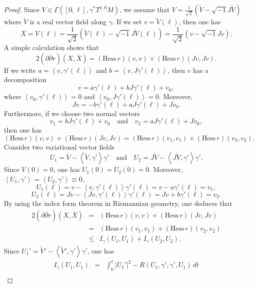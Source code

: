 \documentclass[12pt,reqno]{amsart}
\newcommand\bp{{\bar\partial}}
\theoremstyle{plain}
\theoremstyle{definition}
\newcommand{\sq}{\sqrt{-1}}
\newcommand{\p}{\partial}
\renewcommand{\bar}{\overline}
\newcommand{\beq}{\begin{equation}}
\newcommand{\eeq}{\end{equation}}
\renewcommand{\tilde}{\widetilde}
\newcommand{\qtq}[1]{\quad\mbox{#1}\quad}
\renewcommand{\bp}{\bar{\partial}}
\renewcommand{\>}{\rightarrow}
\newcommand{\LL}{\left\langle}
\newcommand{\RL}{\right\rangle}
\numberwithin{equation}{section} %
\renewcommand{\leq}{\leqslant}
\begin{document}
\begin{proof}
    Since $V\in \Gamma([0,\ell],\gamma^*T^{1,0}M)$, we  assume that $V=\frac{1}{\sqrt{2}}\left(\tilde V-\sq J\tilde V\right)$ where $\tilde V$ is a real vector field along $\gamma$.
    If we set $v=\tilde V(\ell)$, then one has
    \beq
        X=V(\ell)=\frac{1}{\sqrt{2}}\left(\tilde V(\ell)-\sq J\tilde V(\ell)\right)=\frac{1}{\sqrt{2}}\left(v-\sq Jv\right).
    \eeq
A simple calculation shows that
    \beq
        2\left(\p\bp r\right)\left(X,\bar X\right)=  \left(\mathrm{Hess}\,r\right)(v,v)+ \left(\mathrm{Hess}\,r\right)(Jv,J v).
    \eeq
    If we write $a=\LL v,\gamma'(\ell)\RL$ and $b=\LL v,J\gamma'(\ell)\RL$, then $v$ has a decomposition
    \beq
        v=a \gamma'(\ell)+bJ\gamma'(\ell)+v_0,
    \eeq
where $\LL v_0,\gamma'(\ell)\RL=0$ and $\LL v_0,J\gamma'(\ell)\RL=0$. Moreover,
    \beq
        Jv=-b\gamma'(\ell)+aJ\gamma'(\ell)+Jv_0.
    \eeq
    Furthermore, if we choose two normal vectors
    \beq
        v_1=bJ\gamma'(\ell)+v_0\qtq{and} v_2=aJ\gamma'(\ell)+Jv_0,
    \eeq
    then one has
    \beq
        \left(\mathrm{Hess}\,r\right)(v,v)+\left(\mathrm{Hess}\,r\right)(Jv,J v)
        = \left(\mathrm{Hess}\,r\right)(v_1,v_1)+\left(\mathrm{Hess}\,r\right)(v_2,v_2).
    \eeq
    Consider two variational vector fields
    \beq
        U_1=\tilde V-\LL \tilde V,\gamma'\RL\gamma' \qtq{and}
        U_2=J\tilde V-\LL J\tilde V,\gamma'\RL\gamma'.
    \eeq
    Since $V(0)=0$, one has $U_1(0)=U_2(0)=0$. Moreover, $\LL U_1,\gamma'\RL=\LL U_2,\gamma'\RL\equiv 0$,
    \beq
        U_1(\ell)= v-\LL v,\gamma'(\ell)\RL\gamma'(\ell) = v- a\gamma'(\ell)=v_1,
    \eeq
    \beq
        U_2(\ell)= Jv-\LL Jv,\gamma'(\ell)\RL\gamma'(\ell) = Jv+b\gamma'(\ell)=v_2.
    \eeq
    By using the index form theorem in Riemannian geometry, one deduces that
    \begin{eqnarray}
        2\left(\p\bp r\right)\left(X,\bar X\right)
        &=& \left(\mathrm{Hess}\,r\right)(v,v)+\left(\mathrm{Hess}\,r\right)(Jv,J v)  \nonumber\\
        &=& \left(\mathrm{Hess}\,r\right)(v_1,v_1)+\left(\mathrm{Hess}\,r\right)(v_2,v_2) \nonumber\\
        &\leq&  I_\gamma(U_1,U_1)+   I_\gamma(U_2,U_2).\label{index form}
    \end{eqnarray}
    Since $U_1'=\tilde V'-\LL \tilde V',\gamma'\RL\gamma' $, one has
    \begin{eqnarray}
        I_\gamma(U_1,U_1)
        &=& \int_0^\ell |U_1'|^2-R(U_1,\gamma',\gamma',U_1)\,dt  \nonumber\\

\end{eqnarray}
\end{proof}
\end{document}
